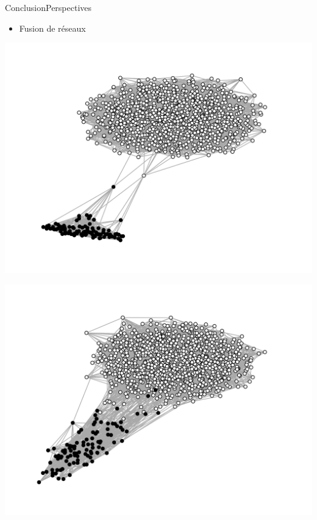 \begin{frame}{Conclusion}{Perspectives}

  \begin{itemize}   
  \item Fusion de réseaux
  \end{itemize}

  \begin{minipage}{0.325\textwidth}
    \includegraphics[width=1.2\textwidth]{img/graphA.png}
  \end{minipage}
  \begin{minipage}{0.325\textwidth}
    \includegraphics[width=1.2\textwidth]{img/graphB.png}
  \end{minipage}
  \begin{minipage}{0.325\textwidth}

\end{minipage}
\end{frame}
